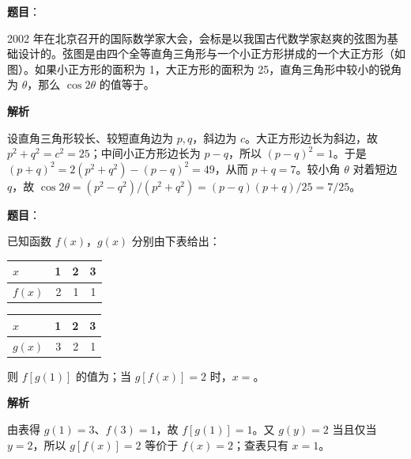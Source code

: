 \begin{answer}

\textbf{题目}：

2002 年在北京召开的国际数学家大会，会标是以我国古代数学家赵爽的弦图为基础设计的。弦图是由四个全等直角三角形与一个小正方形拼成的一个大正方形（如图）。如果小正方形的面积为 1，大正方形的面积为 25，直角三角形中较小的锐角为 $\theta$，那么 $\cos 2\theta$ 的值等于\gkblank{}。
\nopagebreak[4]
\begin{center}\end{center}
\nopagebreak[4]
\textbf{解析}

设直角三角形较长、较短直角边为 $p,q$，斜边为 $c$。大正方形边长为斜边，故 $p^2+q^2=c^2=25$；中间小正方形边长为 $p-q$，所以 $(p-q)^2=1$。于是 $(p+q)^2=2(p^2+q^2)-(p-q)^2=49$，从而 $p+q=7$。较小角 $\theta$ 对着短边 $q$，故 $\cos2\theta=(p^2-q^2)/(p^2+q^2)=(p-q)(p+q)/25=7/25$。


\end{answer}
\begin{answer}

\textbf{题目}：

已知函数 $f(x)$，$g(x)$ 分别由下表给出：

\begin{center}
\begin{tabular}{lrrr}
\toprule
$x$ & 1 & 2 & 3 \\
\midrule
$f(x)$ & 2 & 1 & 1 \\
\bottomrule
\end{tabular}
\end{center}

\begin{center}
\begin{tabular}{lrrr}
\toprule
$x$ & 1 & 2 & 3 \\
\midrule
$g(x)$ & 3 & 2 & 1 \\
\bottomrule
\end{tabular}
\end{center}

则 $f[g(1)]$ 的值为\gkblank{}；当 $g[f(x)]=2$ 时，$x=$\gkblank{}。

\textbf{解析}

由表得 $g(1)=3$、$f(3)=1$，故 $f[g(1)]=1$。又 $g(y)=2$ 当且仅当 $y=2$，所以 $g[f(x)]=2$ 等价于 $f(x)=2$；查表只有 $x=1$。


\end{answer}

